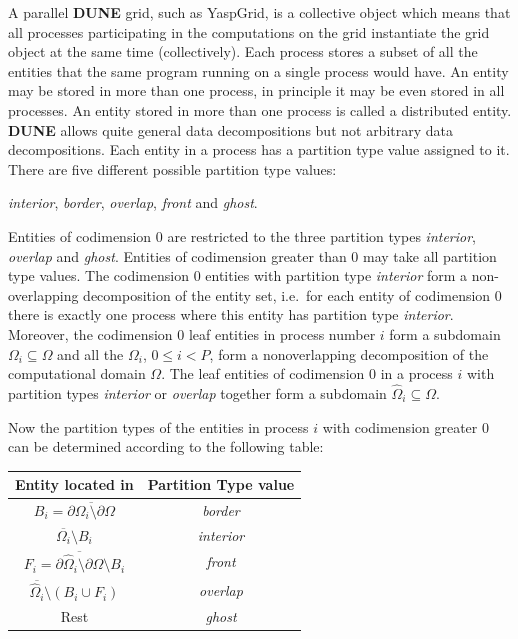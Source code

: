 \documentclass[11pt,a4paper,headinclude,footinclude,DIV16,headings=normal]{scrreprt}
\newcommand{\Dune}{{\sffamily\bfseries DUNE}\xspace}
\begin{document}
A parallel \Dune{} grid, such as YaspGrid, is a collective object which
means that all processes participating in the computations on the grid
instantiate the grid object at the same time (collectively). Each
process stores a subset of all the entities that the same program running on a
single process would have. An entity may be stored in more
than one process, in principle it may be even stored in all
processes. An entity
stored in more than one process is called a distributed entity. \Dune{}
allows quite general data decompositions but not arbitrary data
decompositions. Each entity in a process has a partition type
value assigned to it. There are five different possible partition type
values:
\begin{center}
\textit{interior}, \textit{border}, \textit{overlap},
  \textit{front} and \textit{ghost}.
\end{center}

Entities of codimension 0 are restricted to the three partition types
\textit{interior}, \textit{overlap} and \textit{ghost}. Entities of
codimension greater than 0 may take all partition type values.
The codimension 0 entities with partition type \textit{interior} form a
non-overlapping decomposition of the entity set, i.e.~for each
entity of codimension 0 there is exactly one process where this entity
has partition type \textit{interior}.
Moreover, the codimension 0 leaf entities in process number $i$ form a
subdomain $\Omega_i\subseteq\Omega$ and all the $\Omega_i$, $0\leq i <
P$, form a nonoverlapping decomposition of the computational domain
$\Omega$. The leaf entities of codimension 0 in a process $i$ with
partition types \textit{interior} or \textit{overlap} together form a
subdomain $\hat{\Omega}_i\subseteq\Omega$.

Now the partition types of the entities in process $i$
with codimension greater 0 can
be determined according to the following table:
\begin{center}
\begin{tabular}{cc}
\hline
\hline
Entity located in & Partition Type value\\
\hline
$B_i=\overline{\partial\Omega_i\setminus\partial\Omega}$ &
\textit{border}\\
$\overline{\Omega_i}\setminus B_i$ & \textit{interior}\\
$F_i =
\overline{\partial\hat{\Omega}_i\setminus\partial\Omega}\setminus B_i$
& \textit{front}\\
$\overline{\hat{\Omega}_i}\setminus(B_i\cup F_i)$ & \textit{overlap}\\
Rest & \textit{ghost}\\
\hline
\hline
\end{tabular}
\end{center}
\end{document}
